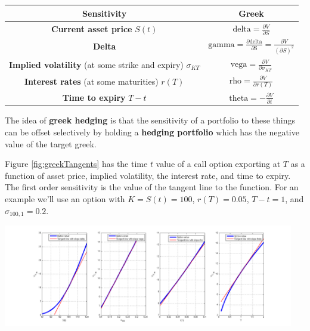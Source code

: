 \begin{center}
\begin{tabular}{|c|c|}
\hline
Sensitivity & Greek \\
\hline
\textbf{Current asset price} $S(t)$ & $\mbox{delta} = \frac{\partial V}{\partial S}$\\
\textbf{Delta} & $\mbox{gamma} = \frac{\partial \mbox{delta}}{\partial \mbox{S}} = \frac{\partial V}{(\partial S)^2}$\\
\textbf{Implied volatility} (at some strike and expiry) $\sigma_{KT}$ & $\mbox{vega} = \frac{\partial V}{\partial \sigma_{KT}}$\\
\textbf{Interest rates} (at some maturities) $r(T)$ & $\mbox{rho} = \frac{\partial V}{\partial r(T)}$\\
\textbf{Time to expiry} $T-t$ & $\mbox{theta} = -\frac{\partial V}{\partial t}$\\
\hline
\end{tabular}
\end{center}

The idea of \textbf{greek hedging} is that the sensitivity of a portfolio to these things can be offset selectively by holding a \textbf{hedging portfolio} which has the negative value of the target greek. 

Figure \ref{fig:greekTangents} has the time $t$ value of a call option exporting at $T$ as a function of asset price, implied volatility, the interest rate, and time to expiry. The first order sensitivity is the value of the tangent line to the function. For an example we'll use an option with $K = S(t) = 100$, $r(T) = 0.05$, $T-t = 1$, and $\sigma_{100,1} = 0.2$. 

  \begin{center}
\includegraphics[width=5in]{pics/greekTangents}%
\label{fig:greekTangents}%
\end{center}


